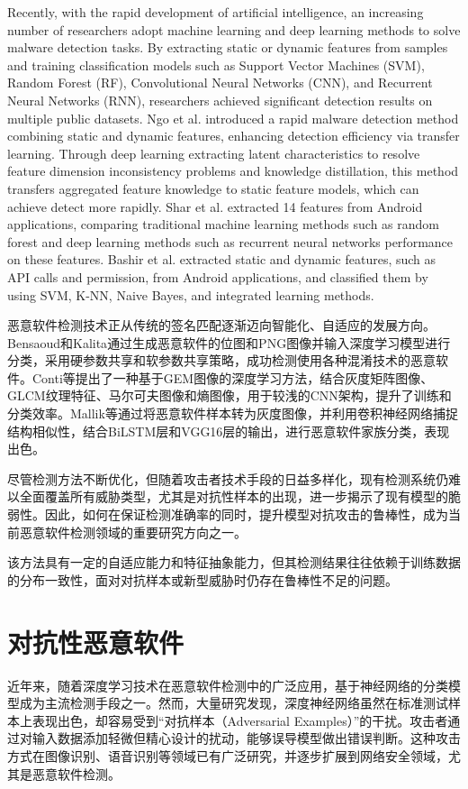 Recently, with the rapid development of artificial intelligence, an increasing number of researchers adopt machine learning and deep learning methods to solve malware detection tasks. By extracting static or dynamic features from samples and training classification models such as Support Vector Machines (SVM), Random Forest (RF), Convolutional Neural Networks (CNN), and Recurrent Neural Networks (RNN), researchers achieved significant detection results on multiple public datasets. Ngo et al. introduced a rapid malware detection method combining static and dynamic features, enhancing detection efficiency via transfer learning\cite{ngo2023fast}. Through deep learning extracting latent characteristics to resolve feature dimension inconsistency problems and knowledge distillation, this method transfers aggregated feature knowledge to static feature models, which can achieve detect more rapidly. Shar et al. extracted 14 features from Android applications, comparing traditional machine learning methods such as random forest and deep learning methods such as recurrent neural networks performance on these features\cite{shar2023experimental}. Bashir et al. extracted static and dynamic features, such as API calls and permission, from Android applications, and classified them by using SVM, K-NN, Naive Bayes, and integrated learning methods\cite{bashir2024hybrid}.

恶意软件检测技术正从传统的签名匹配逐渐迈向智能化、自适应的发展方向。Bensaoud和Kalita\cite{bensaoud2022deep}通过生成恶意软件的位图和PNG图像并输入深度学习模型进行分类，采用硬参数共享和软参数共享策略，成功检测使用各种混淆技术的恶意软件。Conti等\cite{conti2022few}提出了一种基于GEM图像的深度学习方法，结合灰度矩阵图像、GLCM纹理特征、马尔可夫图像和熵图像，用于较浅的CNN架构，提升了训练和分类效率。Mallik等\cite{mallik2022conrec}通过将恶意软件样本转为灰度图像，并利用卷积神经网络捕捉结构相似性，结合BiLSTM层和VGG16层的输出，进行恶意软件家族分类，表现出色。

尽管检测方法不断优化，但随着攻击者技术手段的日益多样化，现有检测系统仍难以全面覆盖所有威胁类型，尤其是对抗性样本的出现，进一步揭示了现有模型的脆弱性。因此，如何在保证检测准确率的同时，提升模型对抗攻击的鲁棒性，成为当前恶意软件检测领域的重要研究方向之一。

该方法具有一定的自适应能力和特征抽象能力，但其检测结果往往依赖于训练数据的分布一致性，面对对抗样本或新型威胁时仍存在鲁棒性不足的问题。

\section{对抗性恶意软件}
近年来，随着深度学习技术在恶意软件检测中的广泛应用，基于神经网络的分类模型成为主流检测手段之一。然而，大量研究发现，深度神经网络虽然在标准测试样本上表现出色，却容易受到“对抗样本（Adversarial Examples）”的干扰。攻击者通过对输入数据添加轻微但精心设计的扰动，能够误导模型做出错误判断。这种攻击方式在图像识别、语音识别等领域已有广泛研究，并逐步扩展到网络安全领域，尤其是恶意软件检测。

